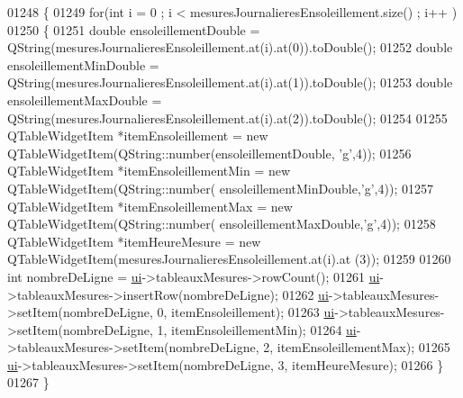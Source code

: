 \begin{DoxyCode}
01248 \{
01249     \textcolor{keywordflow}{for}(\textcolor{keywordtype}{int} i = 0 ; i < mesuresJournalieresEnsoleillement.size() ; i++ )
01250     \{
01251         \textcolor{keywordtype}{double} ensoleillementDouble = QString(mesuresJournalieresEnsoleillement.at(i).at(0)).toDouble();
01252         \textcolor{keywordtype}{double} ensoleillementMinDouble = QString(mesuresJournalieresEnsoleillement.at(i).at(1)).toDouble();
01253         \textcolor{keywordtype}{double} ensoleillementMaxDouble = QString(mesuresJournalieresEnsoleillement.at(i).at(2)).toDouble();
01254 
01255         QTableWidgetItem *itemEnsoleillement = \textcolor{keyword}{new} QTableWidgetItem(QString::number(ensoleillementDouble,\textcolor{charliteral}{
      'g'},4));
01256         QTableWidgetItem *itemEnsoleillementMin = \textcolor{keyword}{new} QTableWidgetItem(QString::number(
      ensoleillementMinDouble,\textcolor{charliteral}{'g'},4));
01257         QTableWidgetItem *itemEnsoleillementMax = \textcolor{keyword}{new} QTableWidgetItem(QString::number(
      ensoleillementMaxDouble,\textcolor{charliteral}{'g'},4));
01258         QTableWidgetItem *itemHeureMesure = \textcolor{keyword}{new} QTableWidgetItem(mesuresJournalieresEnsoleillement.at(i).at
      (3));
01259 
01260         \textcolor{keywordtype}{int} nombreDeLigne = \hyperlink{class_ruche_ihm_a64786058bd7f88ca2f1e9743bb27c25b}{ui}->tableauxMesures->rowCount();
01261         \hyperlink{class_ruche_ihm_a64786058bd7f88ca2f1e9743bb27c25b}{ui}->tableauxMesures->insertRow(nombreDeLigne);
01262         \hyperlink{class_ruche_ihm_a64786058bd7f88ca2f1e9743bb27c25b}{ui}->tableauxMesures->setItem(nombreDeLigne, 0, itemEnsoleillement);
01263         \hyperlink{class_ruche_ihm_a64786058bd7f88ca2f1e9743bb27c25b}{ui}->tableauxMesures->setItem(nombreDeLigne, 1, itemEnsoleillementMin);
01264         \hyperlink{class_ruche_ihm_a64786058bd7f88ca2f1e9743bb27c25b}{ui}->tableauxMesures->setItem(nombreDeLigne, 2, itemEnsoleillementMax);
01265         \hyperlink{class_ruche_ihm_a64786058bd7f88ca2f1e9743bb27c25b}{ui}->tableauxMesures->setItem(nombreDeLigne, 3, itemHeureMesure);
01266     \}
01267 \}
\end{DoxyCode}
\mbox{\label{class_ruche_ihm_a7c292baed04f6240697afb6c6f894358}} 
